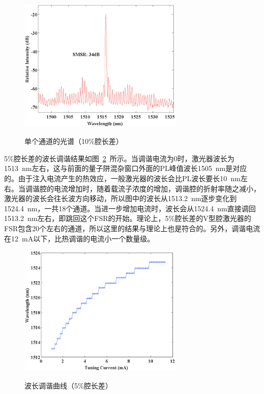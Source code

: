 \documentclass{ZJUthesis}
\begin{document}
\begin{figure}[htbp]
  \centering
  \includegraphics[width=0.7\textwidth]{./Pictures/single_spectrum_p10.eps}\\
  \caption{单个通道的光谱（10\%腔长差）}
  \label{fig_single_spectrum_p10}
\end{figure}

5\%腔长差的波长调谐结果如图~\ref{fig_single_tuning_p5}~所示。当调谐电流为0时，激光器波长为1513~nm左右，这与前面的量子阱混杂窗口外面的PL峰值波长1505~nm是对应的。由于注入电流产生的热效应，一般激光器的波长会比PL波长要长10~nm左右。当调谐腔的电流增加时，随着载流子浓度的增加，调谐腔的折射率随之减小，激光器的波长会往长波方向移动，所以图中的波长从1513.2~nm逐步变化到1524.4~nm，一共18个通道。当进一步增加电流时，波长会从1524.4~nm直接调回1513.2~nm左右，即跳回这个FSR的开始。理论上，5\%腔长差的V型腔激光器的FSR包含20个左右的通道，所以这里的结果与理论上也是符合的。另外，调谐电流在12~mA以下，比热调谐的电流小一个数量级。

\begin{figure}[htbp]
  \centering
  \includegraphics[width=0.7\textwidth]{./Pictures/single_tuning_p5.eps}\\
  \caption{波长调谐曲线（5\%腔长差）}
  \label{fig_single_tuning_p5}
\end{figure}
\end{document}
